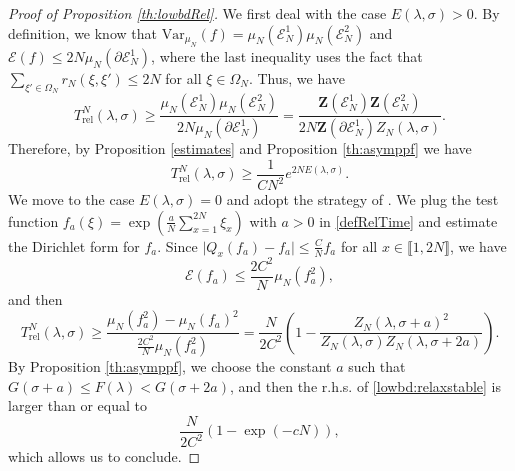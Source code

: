 \documentclass[reqno,11pt]{amsart}
\numberwithin{equation}{section}
\newcommand{\gO}{\Omega}
\newcommand{\gl}{\lambda}
\newcommand{\gs}{\sigma}
\newcommand{\cE}{{\ensuremath{\mathcal E}} }
\newcommand{\bZ}{{\ensuremath{\mathbf Z}} }
\newcommand{\lint}{\llbracket}
\newcommand{\rint}{\rrbracket}
\newcommand{\Var}{\mathrm{Var}}
\newcommand{\Rel}{\mathrm{rel}}
\begin{document}
\begin{proof}[Proof of Proposition \ref{th:lowbdRel}]
We first deal with the case $E(\gl,\gs)>0$.
 By definition, we know that
$\Var_{\mu_N}(f)=\mu_N \left( \mathcal{E}_N^1 \right) \mu_N \left(\mathcal{E}_N^2\right)$ and
$\mathcal{E}(f)
\leq 2N\mu_N \left(\partial\mathcal{E}_N^1\right)$,
where the last inequality uses the fact that
$\sum_{\xi'\in \gO_N} r_N(\xi, \xi')\leq 2N$ for all $\xi\in \Omega_N$. 
Thus, we have
\begin{equation}\label{lowbdRel1step}
T_{\Rel}^N(\lambda, \sigma)\geq \frac{\mu_N\left(\mathcal{E}_N^1\right)\mu_N\left(\mathcal{E}_N^2\right)}{2N\mu_N\left(\partial \mathcal{E}_N^1\right) }= \frac{\bZ\left(\mathcal{E}_N^1\right)\bZ\left(\mathcal{E}_N^2\right)}{2N \bZ\left(\partial \mathcal{E}_N^1\right) Z_N(\gl,\sigma)}. 
 \end{equation}
 Therefore, by Proposition \ref{estimates} and Proposition \ref{th:asymppf} we have
\begin{equation}
T_{\Rel}^N(\lambda, \sigma)\geq \frac{1}{C N^2} e^{2N E(\gl,\gs)}.
\end{equation}
We move to the case $E(\gl, \gs)=0$ and adopt the strategy of \cite[Proposition 5.1]{caputo2008approach}. We  plug the test function $f_a(\xi)= \exp(\frac{a}{N}\sum_{x=1}^{2N} \xi_x)$ with $a>0$ in \eqref{defRelTime} and estimate the Dirichlet form for $f_a$.
 Since $\vert Q_x(f_a)-f_a \vert \le \frac{C}{N} f_a$ for all $x \in \lint 1, 2N \rint$, we have
 $$ \cE(f_a) \le \frac{2C^2}{N} \mu_N(f_a^2),$$
 and then
 \begin{equation}\label{lowbd:relaxstable}
 T_{\Rel}^N(\gl, \gs) \ge \frac{\mu_N(f_a^2)-\mu_N(f_a)^2}{\frac{2C^2}{N} \mu_N(f_a^2)}= \frac{N}{2C^2} \left(1-\frac{Z_N(\gl, \gs+a)^2}{Z_N(\gl, \gs) Z_N(\gl, \gs+2a)}\right).
 \end{equation}
 By Proposition \ref{th:asymppf}, we choose the constant $a$  such that $G(\sigma+a)\leq F(\lambda)<G(\sigma+2a)$,  and then the r.h.s. of \eqref{lowbd:relaxstable} is larger than or equal to
 $$
  \frac{N}{2C^2}\left(1- \exp(-c N)\right),$$ 
 which allows us to conclude.
 
 
 
\end{proof}
\end{document}

